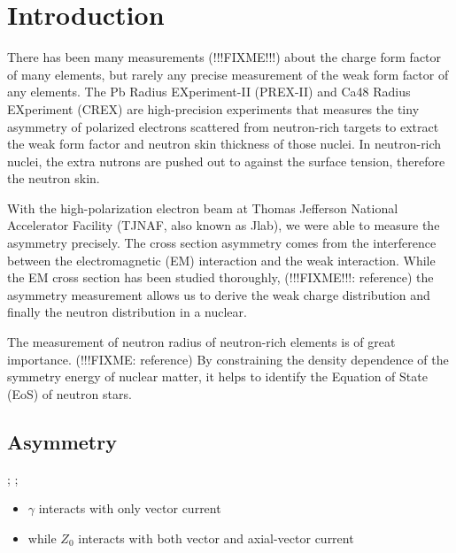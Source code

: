 \section{Introduction}
There has been many measurements (!!!FIXME!!!) about the charge form factor of many elements,
but rarely any precise measurement of the weak form factor of any elements.
The Pb Radius EXperiment-II (PREX-II) and Ca48 Radius EXperiment (CREX) are 
high-precision experiments that measures the tiny asymmetry of polarized electrons
scattered from neutron-rich targets to extract the weak form factor and neutron
skin thickness of those nuclei. In neutron-rich nuclei, the extra nutrons are
pushed out to against the surface tension\cite{PRL.85.5296}, therefore the neutron skin.

With the high-polarization electron beam at 
Thomas Jefferson National Accelerator Facility (TJNAF, also known as Jlab), 
we were able to measure the asymmetry precisely. 
The cross section asymmetry comes from the interference between 
the electromagnetic (EM) interaction and the weak interaction. While the EM 
cross section has been studied thoroughly, (!!!FIXME!!!: reference) the asymmetry 
measurement allows us to derive the weak charge distribution and finally the
neutron distribution in a nuclear.

The measurement of neutron radius of neutron-rich elements is of great importance.
(!!!FIXME: reference)
By constraining the density dependence of the symmetry energy of nuclear matter,
it helps to identify the Equation of State (EoS) of neutron stars.

\subsection{Asymmetry}
;
;

\begin{itemize}
    \item $\gamma$ interacts with only vector current
    \item while $Z_0$ interacts with both vector and axial-vector current
\end{itemize}

